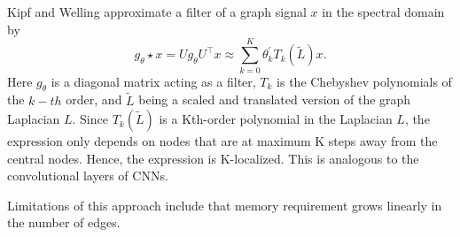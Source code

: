\documentclass{article}
\begin{document}
\section{}
\section{}
\section{}
\subsection{}
\cite{kipf_semi-supervised_2017} 

Kipf and Welling approximate a filter of a graph signal $x$ in the spectral domain by 
$$
g_\theta \star x=U g_\theta U^{\top} x \approx \sum_{k=0}^K \theta_k^{\prime} T_k(\tilde{L}) x.
$$
Here $g_\theta$ is a diagonal matrix acting as a filter, $T_k$ is the Chebyshev polynomials of the $k-th$ order, and $\tilde{L}$ being a scaled and translated version of the graph Laplacian $L$. Since $T_k(\tilde{L})$ is a Kth-order polynomial in the Laplacian $L$, the expression only depends on nodes that are at maximum K steps away from the central nodes. Hence, the expression is K-localized. This is analogous to the convolutional layers of CNNs.    

Limitations of this approach include that memory requirement grows linearly in the number of edges.
\end{document}
